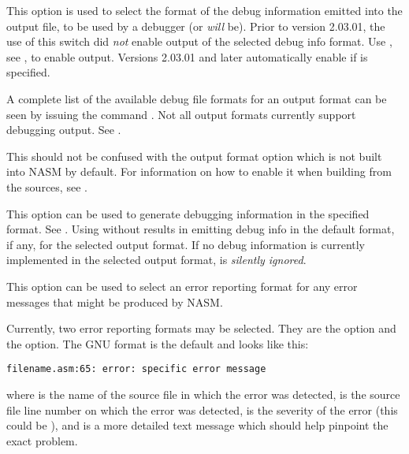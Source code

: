 
This option is used to select the format of the debug information
emitted into the output file, to be used by a debugger (or \emph{will}
be). Prior to version 2.03.01, the use of this switch did \emph{not}
enable output of the selected debug info format. Use ,
see , to enable output. Versions 2.03.01 and later
automatically enable  if  is specified.

A complete list of the available debug file formats for an output
format can be seen by issuing the command .
Not all output formats currently support debugging output.
See .

This should not be confused with the  output format
option which is not built into NASM by default. For information on how
to enable it when building from the sources, see .


This option can be used to generate debugging information in the specified
format. See . Using  without 
results in emitting debug info in the default format, if any, for the
selected output format. If no debug information is currently implemented
in the selected output format,  is \emph{silently ignored}.


This option can be used to select an error reporting format for any
error messages that might be produced by NASM.

Currently, two error reporting formats may be selected. They are
the  option and the  option.
The GNU format is the default and looks like this:

\begin{lstlisting}
filename.asm:65: error: specific error message
\end{lstlisting}

where  is the name of the source file in
which the error was detected,  is the source file
line number on which the error was detected, 
is the severity of the error (this could be ),
and  is a more detailed text message
which should help pinpoint the exact problem.

